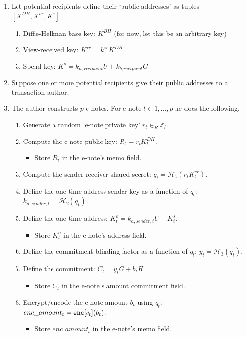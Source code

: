 \begin{enumerate}
    \item Let potential recipients define their `public addresses' as tuples $[K^{DH}, K^{vr}, K^s]$.
    \begin{enumerate}
        \item Diffie-Hellman base key: $K^{DH}$ (for now, let this be an arbitrary key)
        \item View-received key: $K^{vr} = k^{vr} K^{DH}$
        \item Spend key: $K^s = k_{a,recipient} U + k_{b,recipient} G$
    \end{enumerate}

    \item Suppose one or more potential recipients give their public addresses to a transaction author.

    \item The author constructs $p$ e-notes. For e-note $t \in 1,...,p$ he does the following.
    \begin{enumerate}
        \item Generate a random `e-note private key' $r_t \in_R \mathbb{Z}_l$.
        \item Compute the e-note public key: $R_t = r_t K^{DH}_t$.
        \begin{itemize}
            \item Store $R_t$ in the e-note's memo field.
        \end{itemize}
        \item Compute the sender-receiver shared secret: $q_t = \mathcal{H}_1(r_t K^{vr}_t)$.
        \item Define the one-time address sender key as a function of $q_t$: $k_{a,sender,t} = \mathcal{H}_2(q_t)$.
        \item Define the one-time address: $K^o_t = k_{a,sender,t} U + K^s_t$.
        \begin{itemize}
            \item Store $K^o_t$ in the e-note's address field.
        \end{itemize}
        \item Define the commitment blinding factor as a function of $q_t$: $y_t = \mathcal{H}_3(q_t)$.
        \item Define the commitment: $C_t = y_t G + b_t H$.
        \begin{itemize}
            \item Store $C_t$ in the e-note's amount commitment field.
        \end{itemize}
        \item Encrypt/encode the e-note amount $b_t$ using $q_t$: $enc\_amount_t = \textrm{\tt enc}[q_t](b_t)$.
        \begin{itemize}
            \item Store $enc\_amount_t$ in the e-note's memo field.
        \end{itemize}
    \end{enumerate}


\end{enumerate}
